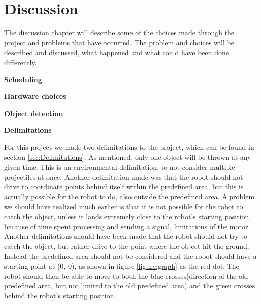 \chapter{Discussion}
\label{chap:Discussion}
The discussion chapter will describe some of the choices made through the project and problems that have occurred. The problem and choices will be described and discussed, what happened and what could have been done differently. 

\textbf{Scheduling}



\textbf{Hardware choices}


\textbf{Object detection}


\textbf{Delimitations}

For this project we made two delimitations to the project, which can be found in section \ref{sec:Delimitations}. As mentioned, only one object will be thrown at any given time. This is an environmental delimitation, to not consider multiple projectiles at once. \newline
Another delimitation made was that the robot should not drive to coordinate points behind itself within the predefined area, but this is actually possible for the robot to do, also outside the predefined area. A problem we should have realized much earlier is that it is not possible for the robot to catch the object, unless it lands extremely close to the robot’s starting position, because of time spent processing and sending a signal, limitations of the motor. Another delimitations should have been made that the robot should not try to catch the object, but rather drive to the point where the object hit the ground. \newline
Instead the predefined area should not be considered and the robot should have a starting point at (0, 0), as shown in figure \ref{figure:graph} as the red dot. The robot should then be able to move to both the blue crosses(direction of the old predefined area, but not limited to the old predefined area) and the green crosses behind the robot’s starting position. 


